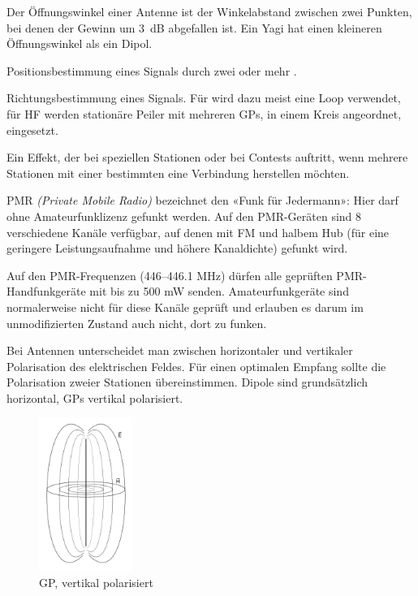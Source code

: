 {Der Öffnungswinkel einer Antenne ist der Winkelabstand zwischen zwei Punkten, bei denen der Gewinn um 3 dB abgefallen ist. Ein Yagi hat einen kleineren Öffnungswinkel als ein Dipol.}

{Positionsbestimmung eines Signals durch zwei oder mehr .}

{Richtungsbestimmung eines Signals. Für  wird dazu meist eine Loop verwendet, für HF werden stationäre Peiler mit mehreren GPs, in einem Kreis angeordnet, eingesetzt.}

{Ein Effekt, der bei speziellen Stationen oder bei Contests auftritt, wenn mehrere Stationen mit einer bestimmten eine Verbindung herstellen möchten.}

{PMR \textit{(Private Mobile Radio)} bezeichnet den «Funk für Jedermann»: Hier darf ohne Amateurfunklizenz gefunkt werden. Auf den PMR-Geräten sind 8 verschiedene Kanäle verfügbar, auf denen mit FM und halbem Hub (für eine geringere Leistungsaufnahme und höhere Kanaldichte) gefunkt wird.

Auf den PMR-Frequenzen (446–446.1 MHz) dürfen alle geprüften PMR-Handfunkgeräte mit bis zu 500 mW senden. Amateurfunkgeräte sind normalerweise nicht für diese Kanäle geprüft und erlauben es darum im unmodifizierten Zustand auch nicht, dort zu funken.}

{Bei Antennen unterscheidet man zwischen horizontaler und vertikaler Polarisation des elektrischen Feldes. Für einen optimalen Empfang sollte die Polarisation zweier Stationen übereinstimmen. Dipole sind grundsätzlich horizontal, GPs vertikal polarisiert.

\begin{figure}[h!]
 \centering
 \includegraphics[height=5cm]{./png/Amfu-Antenne-Polarisation.png}
 \caption{GP, vertikal polarisiert}
 \label{fig:polarisation}
\end{figure}

}

